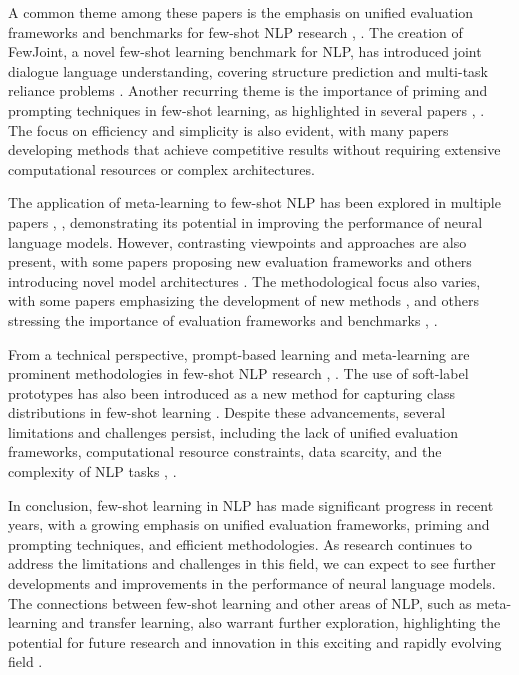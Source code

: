 \documentclass[conference]{IEEEtran}
\begin{document}
A common theme among these papers is the emphasis on unified evaluation frameworks and benchmarks for few-shot NLP research \cite{b2}, \cite{b5}. The creation of FewJoint, a novel few-shot learning benchmark for NLP, has introduced joint dialogue language understanding, covering structure prediction and multi-task reliance problems \cite{b5}. Another recurring theme is the importance of priming and prompting techniques in few-shot learning, as highlighted in several papers \cite{b2}, \cite{b3}. The focus on efficiency and simplicity is also evident, with many papers developing methods that achieve competitive results without requiring extensive computational resources or complex architectures.

The application of meta-learning to few-shot NLP has been explored in multiple papers \cite{b6}, \cite{b4}, demonstrating its potential in improving the performance of neural language models. However, contrasting viewpoints and approaches are also present, with some papers proposing new evaluation frameworks \cite{b2} and others introducing novel model architectures \cite{b4}. The methodological focus also varies, with some papers emphasizing the development of new methods \cite{b3}, \cite{b4} and others stressing the importance of evaluation frameworks and benchmarks \cite{b2}, \cite{b5}.

From a technical perspective, prompt-based learning and meta-learning are prominent methodologies in few-shot NLP research \cite{b2}, \cite{b6}. The use of soft-label prototypes has also been introduced as a new method for capturing class distributions in few-shot learning \cite{b4}. Despite these advancements, several limitations and challenges persist, including the lack of unified evaluation frameworks, computational resource constraints, data scarcity, and the complexity of NLP tasks \cite{b2}, \cite{b5}.

In conclusion, few-shot learning in NLP has made significant progress in recent years, with a growing emphasis on unified evaluation frameworks, priming and prompting techniques, and efficient methodologies. As research continues to address the limitations and challenges in this field, we can expect to see further developments and improvements in the performance of neural language models. The connections between few-shot learning and other areas of NLP, such as meta-learning and transfer learning, also warrant further exploration, highlighting the potential for future research and innovation in this exciting and rapidly evolving field \cite{b1}.
\end{document}
